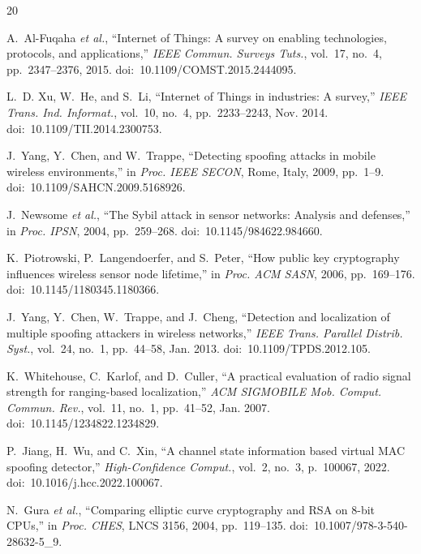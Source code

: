 \documentclass[conference]{IEEEtran}
\begin{document}
\begin{thebibliography}{20}

A.~Al-Fuqaha \textit{et al.}, ``Internet of Things: A survey on enabling technologies, protocols, and applications,'' \textit{IEEE Commun. Surveys Tuts.}, vol.~17, no.~4, pp.~2347--2376, 2015. doi:~10.1109/COMST.2015.2444095.

L.~D. Xu, W.~He, and S.~Li, ``Internet of Things in industries: A survey,'' \textit{IEEE Trans. Ind. Informat.}, vol.~10, no.~4, pp.~2233--2243, Nov. 2014. doi:~10.1109/TII.2014.2300753.

J.~Yang, Y.~Chen, and W.~Trappe, ``Detecting spoofing attacks in mobile wireless environments,'' in \textit{Proc. IEEE SECON}, Rome, Italy, 2009, pp.~1--9. doi:~10.1109/SAHCN.2009.5168926.

J.~Newsome \textit{et al.}, ``The Sybil attack in sensor networks: Analysis and defenses,'' in \textit{Proc. IPSN}, 2004, pp.~259--268. doi:~10.1145/984622.984660.

K.~Piotrowski, P.~Langendoerfer, and S.~Peter, ``How public key cryptography influences wireless sensor node lifetime,'' in \textit{Proc. ACM SASN}, 2006, pp.~169--176. doi:~10.1145/1180345.1180366.

J.~Yang, Y.~Chen, W.~Trappe, and J.~Cheng, ``Detection and localization of multiple spoofing attackers in wireless networks,'' \textit{IEEE Trans. Parallel Distrib. Syst.}, vol.~24, no.~1, pp.~44--58, Jan. 2013. doi:~10.1109/TPDS.2012.105.

K.~Whitehouse, C.~Karlof, and D.~Culler, ``A practical evaluation of radio signal strength for ranging-based localization,'' \textit{ACM SIGMOBILE Mob. Comput. Commun. Rev.}, vol.~11, no.~1, pp.~41--52, Jan. 2007. doi:~10.1145/1234822.1234829.

P.~Jiang, H.~Wu, and C.~Xin, ``A channel state information based virtual MAC spoofing detector,'' \textit{High-Confidence Comput.}, vol.~2, no.~3, p.~100067, 2022. doi:~10.1016/j.hcc.2022.100067.

N.~Gura \textit{et al.}, ``Comparing elliptic curve cryptography and RSA on 8-bit CPUs,'' in \textit{Proc. CHES}, LNCS 3156, 2004, pp.~119--135. doi:~10.1007/978-3-540-28632-5\_9.


\end{thebibliography}
\end{document}
